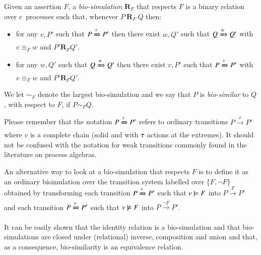 \begin{definition}
Given an assertion $F$, a \emph{bio-simulation} $\mathbf{R}_F$ that respects $F$ is a binary relation over c\CNA \  processes such that, whenever $P~\mathrel{\mathbf{R}_F}~Q$ then:
 \begin{itemize} 
 \item
 for any $v,P'$ such that 
 $P \xRightarrow{v} P'$ then there exist $w,Q'$ such that $Q  \xRightarrow{w} Q'$ with $v\equiv_F w$ and $P' \mathrel{\mathbf{R}_F} Q'$.
\item
 for any $w,Q'$ such that 
 $Q \xRightarrow{w} Q'$ then there exist $v,P'$ such that $P  \xRightarrow{v} P'$ with $v\equiv_F w$ and $P' \mathrel{\mathbf{R}_F} Q'$.
\end{itemize}
We let $ \sim_F $ denote the largest  bio-simulation and we say that $P$ is \emph{bio-similar} to $Q$, with respect to $F$, if $P \sim_F Q$.
\end{definition}

\begin{remark}
Please remember that the notation $P \xRightarrow{v} P'$ refers to ordinary transitions $P \xrightarrow{v} P'$ where $v$ is a complete chain (solid and with $\tau$ actions at the extremes).
It should not be confused with the notation for weak transitions commonly found in the literature on process algebras.
\end{remark}

\begin{remark}
An alternative way to look at a bio-simulation that respects $F$ is to define it as an ordinary bisimulation over the transition system labelled over $\{F,\neg F\}$ obtained by transforming each transition $P \xRightarrow{v} P'$ such that $v\models F$ into $P \xrightarrow{F} P'$ and  each transition $P \xRightarrow{v} P'$ such that $v\not\models F$ into $P \xrightarrow{\neg F} P'$.
\end{remark}

It can be easily shown that the identity relation is a bio-simulation and that bio-simulations are closed under (relational) inverse, composition and union and that, as a consequence, bio-similarity is an equivalence relation.

